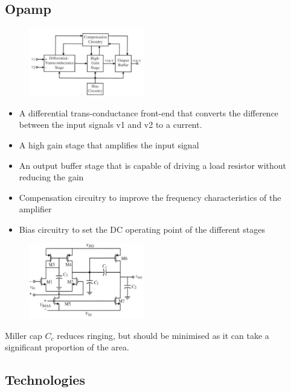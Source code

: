 \documentclass[a4paper,twocolumn]{article}
\begin{document}
		\subsection{Opamp}
			\begin{figure}[ht]
				\centering
				\includegraphics[width=0.45\textwidth]{opamp_parts}
			\end{figure}
			\begin{itemize}
				\item A differential trans-conductance front-end that converts the difference between the input signals 
					v1 and v2 to a current.
				\item A high gain stage that amplifies the input signal
				\item An output buffer stage that is capable of driving a load resistor without reducing
					the gain
				\item Compensation circuitry to improve the frequency characteristics of the amplifier
				\item Bias circuitry to set the DC operating point of the different stages
			\end{itemize}
			
			\begin{figure}[ht]
				\centering
				\includegraphics[width=0.45\textwidth]{opamp_schematic}
			\end{figure}
			Miller cap $C_c$ reduces ringing, but should be minimised as it can take a significant proportion of the area.
		
		\subsection{Technologies}
\end{document}
